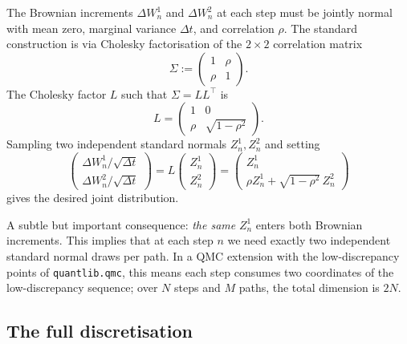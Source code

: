 \documentclass[11pt]{article}
\theoremstyle{plain}
\theoremstyle{definition}
\theoremstyle{remark}
\begin{document}
The Brownian increments $\Delta W^1_n$ and $\Delta W^2_n$ at each step must be jointly normal with mean zero, marginal variance $\Delta t$, and correlation $\rho$. The standard construction is via Cholesky factorisation of the $2\times 2$ correlation matrix
\[
    \Sigma := \begin{pmatrix} 1 & \rho \\ \rho & 1 \end{pmatrix}.
\]
The Cholesky factor $L$ such that $\Sigma = L L^\top$ is
\[
    L = \begin{pmatrix} 1 & 0 \\ \rho & \sqrt{1 - \rho^2} \end{pmatrix}.
\]
Sampling two independent standard normals $Z^1_n, Z^2_n$ and setting
\begin{equation}
    \begin{pmatrix} \Delta W^1_n / \sqrt{\Delta t} \\ \Delta W^2_n / \sqrt{\Delta t} \end{pmatrix} = L \begin{pmatrix} Z^1_n \\ Z^2_n \end{pmatrix} = \begin{pmatrix} Z^1_n \\ \rho Z^1_n + \sqrt{1 - \rho^2}\, Z^2_n \end{pmatrix}                       \label{eq:cholesky}
\end{equation}
gives the desired joint distribution.

A subtle but important consequence: \emph{the same} $Z^1_n$ enters both Brownian increments. This implies that at each step $n$ we need exactly two independent standard normal draws per path. In a QMC extension with the low-discrepancy points of \texttt{quantlib.qmc}, this means each step consumes two coordinates of the low-discrepancy sequence; over $N$ steps and $M$ paths, the total dimension is $2N$.

\subsection{The full discretisation}
\end{document}
